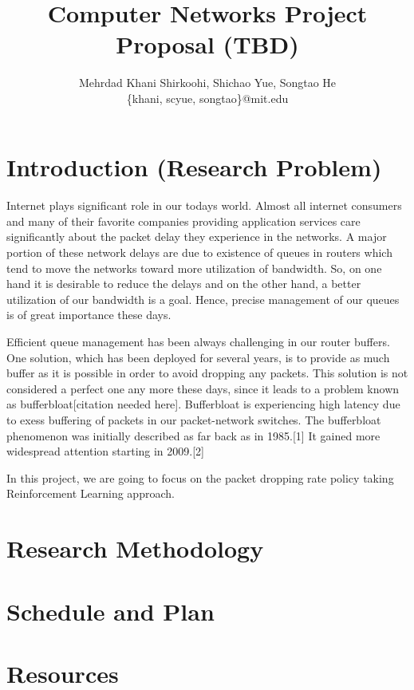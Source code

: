 \documentclass[letterpaper,10pt,onecolumn]{article}
\title{Computer Networks Project Proposal (TBD)}
\author{Mehrdad Khani Shirkoohi, Shichao Yue, Songtao He \\
\{khani, scyue, songtao\}@mit.edu
}
\begin{document}
\date{}
\maketitle
\section{Introduction (Research Problem)}
\paragraph*{}Internet plays significant role in our todays world. Almost all internet consumers and many of their favorite companies providing application services care significantly about the packet delay they experience in the networks. A major portion of these network delays are due to existence of queues in routers which tend to move the networks toward more utilization of bandwidth. So, on one hand it is desirable to reduce the delays and on the other hand, a better utilization of our bandwidth is a goal. Hence, precise management of our queues is of great importance these days.

Efficient queue management has been always challenging in our router buffers. One solution, which has been deployed for several years, is to provide as much buffer as it is possible in order to avoid dropping any packets. This solution is not considered a perfect one any more these days, since it leads to a problem known as bufferbloat[citation needed here]. Bufferbloat is experiencing high latency due to exess buffering of packets in our packet-network switches. The bufferbloat phenomenon was initially described as far back as in 1985.[1] It gained more widespread attention starting in 2009.[2] 

In this project, we are going to focus on the packet dropping rate policy taking Reinforcement Learning approach.



\section{Research Methodology}
\section{Schedule and Plan}
\section{Resources}
\end{document}
